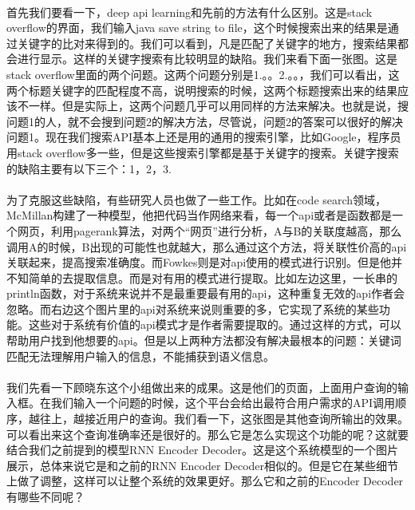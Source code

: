 \documentclass[UTF8]{ctexart}
\begin{document}
			\paragraph{}
			首先我们要看一下，deep api learning和先前的方法有什么区别。这是stack overflow的界面，我们输入java save string to file，这个时候搜索出来的结果是通过关键字的比对来得到的。我们可以看到，凡是匹配了关键字的地方，搜索结果都会进行显示。这样的关键字搜索有比较明显的缺陷。我们来看下面一张图。这是stack overflow里面的两个问题。这两个问题分别是1.。。2.。。，我们可以看出，这两个标题关键字的匹配程度不高，说明搜索的时候，这两个标题搜索出来的结果应该不一样。但是实际上，这两个问题几乎可以用同样的方法来解决。也就是说，搜问题1的人，就不会搜到问题2的解决方法，尽管说，问题2的答案可以很好的解决问题1。现在我们搜索API基本上还是用的通用的搜索引擎，比如Google，程序员用stack overflow多一些，但是这些搜索引擎都是基于关键字的搜索。关键字搜索的缺陷主要有以下三个：1，2，3.
			\paragraph{}
			为了克服这些缺陷，有些研究人员也做了一些工作。比如在code search领域，McMillan构建了一种模型，他把代码当作网络来看，每一个api或者是函数都是一个网页，利用pagerank算法，对两个“网页”进行分析，A与B的关联度越高，那么调用A的时候，B出现的可能性也就越大，那么通过这个方法，将关联性价高的api关联起来，提高搜索准确度。而Fowkes则是对api使用的模式进行识别。但是他并不知简单的去提取信息。而是对有用的模式进行提取。比如左边这里，一长串的println函数，对于系统来说并不是最重要最有用的api，这种重复无效的api作者会忽略。而右边这个图片里的api对系统来说则重要的多，它实现了系统的某些功能。这些对于系统有价值的api模式才是作者需要提取的。通过这样的方式，可以帮助用户找到他想要的api。但是以上两种方法都没有解决最根本的问题：关键词匹配无法理解用户输入的信息，不能捕获到语义信息。
			\paragraph{}
			我们先看一下顾晓东这个小组做出来的成果。这是他们的页面，上面用户查询的输入框。在我们输入一个问题的时候，这个平台会给出最符合用户需求的API调用顺序，越往上，越接近用户的查询。我们看一下，这张图是其他查询所输出的效果。可以看出来这个查询准确率还是很好的。那么它是怎么实现这个功能的呢？这就要结合我们之前提到的模型RNN Encoder Decoder。这是这个系统模型的一个图片展示，总体来说它是和之前的RNN Encoder Decoder相似的。但是它在某些细节上做了调整，这样可以让整个系统的效果更好。那么它和之前的Encoder Decoder有哪些不同呢？
\end{document}
